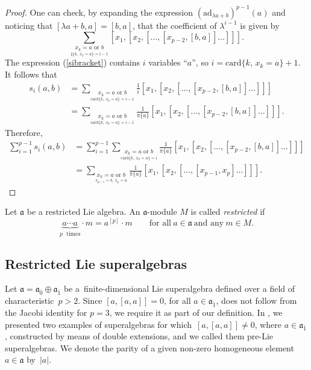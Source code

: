 \documentclass[pdftex]{sigma}
\numberwithin{equation}{section}
\begin{document}
\begin{proof}
 One can check, by expanding the expression $(\mathrm{ad}_{\lambda a+b})^{p-1}(a)$ and noticing that $[\lambda a+b,a]=[b,a]$, that the coefficient of $\lambda^{i-1}$ is given by
 \begin{equation}
 \label{sibracket}
 \sum_{\underset{\sharp\{k,~x_k=a\}=i-1}{x_k=a \text{ or } b}}[x_1,[x_2,[\dots ,[x_{p-2},[b,a]]\dots ]]].
 \end{equation}
The expression (\ref{sibracket}) contains $i$ variables ``$a$'', so $i=\mathrm{card}\{k,\,x_k=a\}+1. $
It follows that
\begin{align*}
 s_i(a,b)&=\sum_{\underset{\text{card}\{k,~x_k=a\}=i-1}{x_k=a \text{ or } b}}\frac{1}{i}[x_1,[x_2,[\dots ,[x_{p-2},[b,a]]\dots ]]]\\[-1mm]
 &=\sum_{\underset{\text{card}\{k,~x_k=a\}=i-1}{x_k=a \text{ or } b}}\frac{1}{\pi\{a\}}[x_1,[x_2,[\dots ,[x_{p-2},[b,a]]\dots ]]].
\end{align*}
Therefore,
\begin{align*}
 \sum_{i=1}^{p-1}s_i(a,b)&=\sum_{i=1}^{p-1}\sum_{\underset{\text{card}\{k,~x_k=a\}=i}{x_k=a \text{ or } b}}\frac{1}{\pi\{a\}}[x_1,[x_2,[\dots ,[x_{p-2},[b,a]]\dots ]]]\\[-1mm]
 &=\sum_{\underset{x_{p-1}=b,~x_p=a}{x_k=a \text{ or } b}}\frac{1}{\pi\{a\}}[x_1,[x_2,[\dots ,[x_{p-1},x_p]\dots ]]]. \tag*{\qed}
\end{align*}
\renewcommand{\qed}{}
\end{proof}
Let $\mathfrak{a}$ be a restricted Lie algebra. An $\mathfrak{a}$-module $M$ is called \textit{restricted} if
\[
\underbrace{a\cdots a}_{p\text{~~times}}\cdot m =a^{[p]}\cdot m \qquad \text{for all}\ a\in \mathfrak{a} \ \text{and any} \ m\in M.
\]
\subsection{Restricted Lie superalgebras}
Let $\mathfrak{a}=\mathfrak{a}_{\bar 0}\oplus \mathfrak{a}_{\bar 1} $ be a~finite-dimensional Lie superalgebra defined over a field of characteristic~$p>2$. Since $[a,[a,a]]=0$, for all $a\in \mathfrak{a}_{\bar 1}$, does not follow from the Jacobi identity for $p=3$, we require it as part of our definition. In \cite{BBH}, we presented two examples of superalgebras for which~$[a,[a,a]]\not=0$, where $a\in \mathfrak{a}_{\bar 1}$, constructed by means of double extensions, and we called them pre-Lie superalgebras. We denote the parity of a given non-zero homogeneous element~$a\in\mathfrak{a}$ by~$|a|$.
\end{document}
